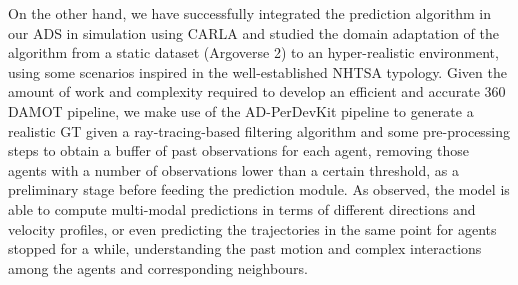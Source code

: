 On the other hand, we have successfully integrated the prediction algorithm in our \ac{ADS} in simulation using CARLA and studied the domain adaptation of the algorithm from a static dataset (Argoverse 2) to an hyper-realistic environment, using some scenarios inspired in the well-established \ac{NHTSA} typology. Given the amount of work and complexity required to develop an efficient and accurate 360 \degree \ac{DAMOT} pipeline, we make use of the \ac{AD-PerDevKit} pipeline to generate a realistic \ac{GT} given a ray-tracing-based filtering algorithm and some pre-processing steps to obtain a buffer of past observations for each agent, removing those agents with a number of observations lower than a certain threshold, as a preliminary stage before feeding the prediction module. As observed, the model is able to compute multi-modal predictions in terms of different directions and velocity profiles, or even predicting the trajectories in the same point for agents stopped for a while, understanding the past motion and complex interactions among the agents and corresponding neighbours. 


